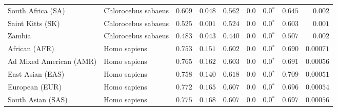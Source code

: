 \begin{center}
\begin{adjustbox}{width = 1\textwidth}
\begin{tabular}{|l|l|r|r|r|r|r|r|r|}
              South Africa (SA) &  Chlorocebus sabaeus &                                        $ 0.609$ &                                           $ 0.048$ &                      $ 0.562$ &            $0.0$ &                  $\bm{0.0{^*}}$ &                                           $ 0.645$ &           $ 0.002$ \\
               Saint Kitts (SK) &  Chlorocebus sabaeus &                                        $ 0.525$ &                                           $ 0.001$ &                      $ 0.524$ &            $0.0$ &                  $\bm{0.0{^*}}$ &                                           $ 0.603$ &           $ 0.001$ \\
                         Zambia &  Chlorocebus sabaeus &                                        $ 0.483$ &                                           $ 0.043$ &                      $ 0.440$ &            $0.0$ &                  $\bm{0.0{^*}}$ &                                           $ 0.507$ &           $ 0.002$ \\
                  African (AFR) &         Homo sapiens &                                        $ 0.753$ &                                           $ 0.151$ &                      $ 0.602$ &            $0.0$ &                  $\bm{0.0{^*}}$ &                                           $ 0.690$ &          $0.00071$ \\
        Ad Mixed American (AMR) &         Homo sapiens &                                        $ 0.765$ &                                           $ 0.162$ &                      $ 0.603$ &            $0.0$ &                  $\bm{0.0{^*}}$ &                                           $ 0.691$ &          $0.00056$ \\
               East Asian (EAS) &         Homo sapiens &                                        $ 0.758$ &                                           $ 0.140$ &                      $ 0.618$ &            $0.0$ &                  $\bm{0.0{^*}}$ &                                           $ 0.709$ &          $0.00051$ \\
                 European (EUR) &         Homo sapiens &                                        $ 0.772$ &                                           $ 0.165$ &                      $ 0.607$ &            $0.0$ &                  $\bm{0.0{^*}}$ &                                           $ 0.696$ &          $0.00054$ \\
              South Asian (SAS) &         Homo sapiens &                                        $ 0.775$ &                                           $ 0.168$ &                      $ 0.607$ &            $0.0$ &                  $\bm{0.0{^*}}$ &                                           $ 0.697$ &          $0.00056$ \\

\end{tabular}
\end{adjustbox}
\end{center}
